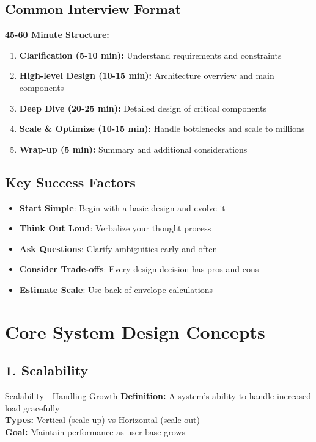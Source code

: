 \documentclass[10pt,a4paper]{article}
\begin{document}
\subsection{Common Interview Format}

\begin{frameworkbox}
\textbf{45-60 Minute Structure:}
\begin{enumerate}
\item \textbf{Clarification (5-10 min):} Understand requirements and constraints
\item \textbf{High-level Design (10-15 min):} Architecture overview and main components
\item \textbf{Deep Dive (20-25 min):} Detailed design of critical components
\item \textbf{Scale \& Optimize (10-15 min):} Handle bottlenecks and scale to millions
\item \textbf{Wrap-up (5 min):} Summary and additional considerations
\end{enumerate}
\end{frameworkbox}

\subsection{Key Success Factors}

\begin{itemize}
\item \textbf{Start Simple}: Begin with a basic design and evolve it
\item \textbf{Think Out Loud}: Verbalize your thought process
\item \textbf{Ask Questions}: Clarify ambiguities early and often
\item \textbf{Consider Trade-offs}: Every design decision has pros and cons
\item \textbf{Estimate Scale}: Use back-of-envelope calculations
\end{itemize}

\section{Core System Design Concepts}

\subsection{1. Scalability}

\begin{conceptbox}{Scalability - Handling Growth}
\textbf{Definition:} A system's ability to handle increased load gracefully\\
\textbf{Types:} Vertical (scale up) vs Horizontal (scale out)\\
\textbf{Goal:} Maintain performance as user base grows
\end{conceptbox}
\end{document}
